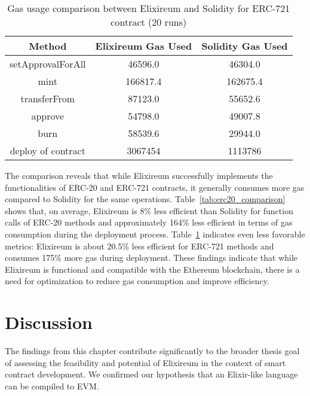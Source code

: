 \begin{table}[h!]
  \centering
  \renewcommand{\arraystretch}{1.2}
  \begin{tabular}{|c|c|c|}
  \hline
  \textbf{Method}         & \textbf{Elixireum Gas Used} & \textbf{Solidity Gas Used} \\ \hline
  setApprovalForAll       & 46596.0              & 46304.0              \\ \hline
  mint                    & 166817.4             & 162675.4             \\ \hline
  transferFrom            & 87123.0              & 55652.6              \\ \hline
  approve                 & 54798.0              & 49007.8              \\ \hline
  burn                    & 58539.6              & 29944.0              \\ \hline
  deploy of contract                 & 3067454              & 1113786              \\ \hline
  \end{tabular}
  \caption{Gas usage comparison between Elixireum and Solidity for ERC-721 contract (20 runs)}
  \label{tab:erc721_comparison}
  \end{table}

  The comparison reveals that while Elixireum successfully implements the functionalities of ERC-20 and ERC-721 contracts, it generally consumes more gas compared to Solidity for the same operations. Table~\ref{tab:erc20_comparison} shows that, on average, Elixireum is 8\% less efficient than Solidity for function calls of ERC-20 methods and approximately 164\% less efficient in terms of gas consumption during the deployment process. Table~\ref{tab:erc721_comparison} indicates even less favorable metrics: Elixireum is about 20.5\% less efficient for ERC-721 methods and consumes 175\% more gas during deployment. These findings indicate that while Elixireum is functional and compatible with the Ethereum blockchain, there is a need for optimization to reduce gas consumption and improve efficiency.

\section{Discussion}
\label{sec:discussion}

The findings from this chapter contribute significantly to the broader thesis goal of assessing the feasibility and potential of Elixireum in the context of smart contract development. We confirmed our hypothesis that an Elixir-like language can be compiled to EVM.


